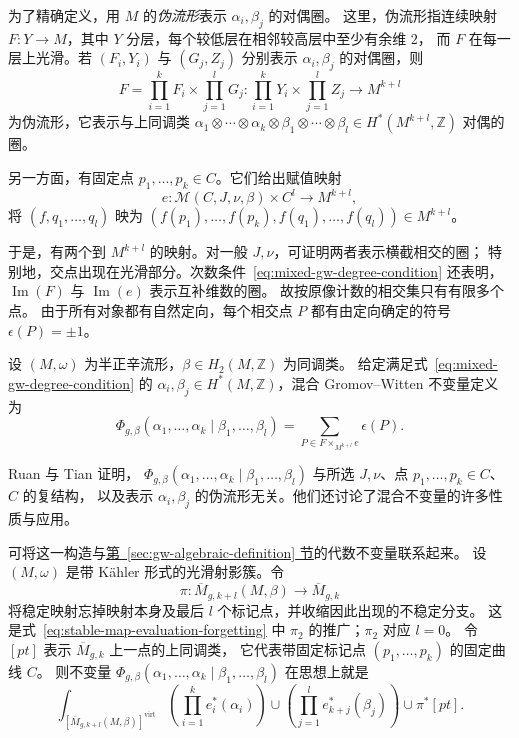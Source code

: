 为了精确定义，用 $M$ 的\emph{伪流形}表示 $\alpha_i,\beta_j$ 的对偶圈。
这里，伪流形指连续映射 $F:Y\to M$，其中 $Y$ 分层，每个较低层在相邻较高层中至少有余维 $2$，
而 $F$ 在每一层上光滑。若 $(F_i,Y_i)$ 与 $(G_j,Z_j)$ 分别表示 $\alpha_i,\beta_j$ 的对偶圈，则
\[
F=\prod_{i=1}^kF_i\times\prod_{j=1}^lG_j:
\prod_{i=1}^kY_i\times\prod_{j=1}^lZ_j\longrightarrow M^{k+l}
\]
为伪流形，它表示与上同调类
$\alpha_1\otimes\cdots\otimes\alpha_k\otimes\beta_1\otimes\cdots\otimes\beta_l
\in H^*(M^{k+l},\mathbb Z)$ 对偶的圈。

另一方面，有固定点 $p_1,\ldots,p_k\in C$。它们给出赋值映射
\[
e:\mathcal M(C,J,\nu,\beta)\times C^l\longrightarrow M^{k+l},
\]
将 $(f,q_1,\ldots,q_l)$ 映为
$(f(p_1),\ldots,f(p_k),f(q_1),\ldots,f(q_l))\in M^{k+l}$。

于是，有两个到 $M^{k+l}$ 的映射。对一般 $J,\nu$，可证明两者表示横截相交的圈；
特别地，交点出现在光滑部分。次数条件~\eqref{eq:mixed-gw-degree-condition} 还表明，
$\operatorname{Im}(F)$ 与 $\operatorname{Im}(e)$ 表示互补维数的圈。
故按原像计数的相交集只有有限多个点。
由于所有对象都有自然定向，每个相交点 $P$ 都有由定向确定的符号 $\epsilon(P)=\pm1$。

\begin{definition}\label{def:mixed-gw-invariant}
设 $(M,\omega)$ 为半正辛流形，$\beta\in H_2(M,\mathbb Z)$ 为同调类。
给定满足式~\eqref{eq:mixed-gw-degree-condition} 的
$\alpha_i,\beta_j\in H^*(M,\mathbb Z)$，混合 Gromov--Witten 不变量定义为
\[
\Phi_{g,\beta}(\alpha_1,\ldots,\alpha_k\mid\beta_1,\ldots,\beta_l)
=\sum_{P\in F\times_{M^{k+l}}e}\epsilon(P).
\]
\end{definition}

Ruan 与 Tian  证明，
$\Phi_{g,\beta}(\alpha_1,\ldots,\alpha_k\mid\beta_1,\ldots,\beta_l)$
与所选 $J,\nu$、点 $p_1,\ldots,p_k\in C$、$C$ 的复结构，
以及表示 $\alpha_i,\beta_j$ 的伪流形无关。他们还讨论了混合不变量的许多性质与应用。

可将这一构造与\hyperref[sec:gw-algebraic-definition]{第~\ref*{sec:gw-algebraic-definition} 节}的代数不变量联系起来。
设 $(M,\omega)$ 是带 Kähler 形式的光滑射影簇。令
\[
\pi:\overline M_{g,k+l}(M,\beta)\longrightarrow\overline M_{g,k}
\]
将稳定映射忘掉映射本身及最后 $l$ 个标记点，并收缩因此出现的不稳定分支。
这是式~\eqref{eq:stable-map-evaluation-forgetting} 中 $\pi_2$ 的推广；$\pi_2$ 对应 $l=0$。
令 $[pt]$ 表示 $\overline M_{g,k}$ 上一点的上同调类，
它代表带固定标记点 $(p_1,\ldots,p_k)$ 的固定曲线 $C$。
则不变量 $\Phi_{g,\beta}(\alpha_1,\ldots,\alpha_k\mid\beta_1,\ldots,\beta_l)$ 在思想上就是
\[
\int_{[\overline M_{g,k+l}(M,\beta)]^{\mathrm{virt}}}
\left(\prod_{i=1}^ke_i^*(\alpha_i)\right)\cup
\left(\prod_{j=1}^le_{k+j}^*(\beta_j)\right)\cup\pi^*[pt].
\]

